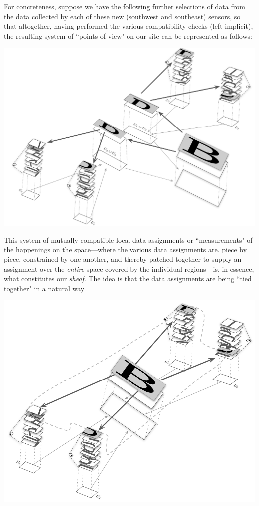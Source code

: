 \documentclass[11pt]{book}
\theoremstyle{definition}
\theoremstyle{definition}
\theoremstyle{definition}
\theoremstyle{theorem}
\theoremstyle{definition}
\begin{document}
	For concreteness, suppose we have the following further selections of data from the data collected by each of these new (southwest and southeast) sensors, so that altogether, having performed the various compatibility checks (left implicit), the resulting system of ``points of view" on our site can be represented as follows:
	\begin{center}
		\includegraphics[angle=16, scale=0.3]{BestSheafEye1.png}
	\end{center} 
	This system of mutually compatible local data assignments or ``measurements" of the happenings on the space---where the various data assignments are, piece by piece, constrained by one another, and thereby patched together to supply an assignment over the \textit{entire} space covered by the individual regions---is, in essence, what constitutes our \textit{sheaf}. The idea is that the data assignments are being ``tied together" in a natural way  
	\begin{center}
		\includegraphics[angle=16, scale=0.3]{Lassoo.png}
	\end{center} 
\end{document}
